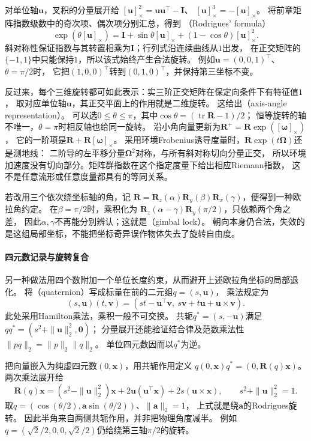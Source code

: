 对单位轴$\bm u$，叉积的分量展开给
$[\bm u]_\times^2=\bm u\bm u^\top-\bm I$、
$[\bm u]_\times^3=-[\bm u]_\times$。
将前章矩阵指数级数中的奇次项、偶次项分别汇总，得到
（Rodrigues' formula）
\begin{equation}
 \exp(\theta[\bm u]_\times)
 =\bm I+\sin\theta[\bm u]_\times+(1-\cos\theta)[\bm u]_\times^2.
 \label{eq:geometry-rodrigues}
\end{equation}
斜对称性保证指数与其转置相乘为$\bm I$；行列式沿连续曲线从$1$出发，
在正交矩阵的$\{-1,1\}$中只能保持$1$，所以该式始终产生合法旋转。
例如$\bm u=(0,0,1)^\top$、$\theta=\pi/2$时，
它把$(1,0,0)^\top$转到$(0,1,0)^\top$，并保持第三坐标不变。

反过来，每个三维旋转都可如此表示：实三阶正交矩阵在保定向条件下有特征值$1$，
取对应单位轴$\bm u$，其正交平面上的作用就是二维旋转。
这给出（axis-angle representation）。
可以选$0\leq\theta\leq\pi$，其中$\cos\theta=(\operatorname{tr}\bm R-1)/2$；
恒等旋转的轴不唯一，$\theta=\pi$时相反轴也给同一旋转。
沿小角向量更新为$\bm R^+=\bm R\exp([\bm\omega]_\times)$，
它的一阶项是$\bm R+\bm R[\bm\omega]_\times$。
采用环境Frobenius诱导度量时，$\bm R\exp(t\bm\Omega)$还是测地线：
二阶导的左平移分量$\bm\Omega^2$对称，与所有斜对称切向分量正交，
所以环境加速度没有切向部分。矩阵群指数在这个指定度量下给出相应Riemann指数，
这不是任意流形或任意度量都具有的等同关系。

若改用三个依次绕坐标轴的角，记
$\bm R=\bm R_z(\alpha)\bm R_y(\beta)\bm R_x(\gamma)$，便得到一种欧拉角约定。
在$\beta=\pi/2$时，乘积化为
$\bm R_z(\alpha-\gamma)\bm R_y(\pi/2)$，只依赖两个角之差，
因此$\alpha,\gamma$不再能分别辨认；这就是（gimbal lock）。
朝向本身仍合法，失效的是这组局部坐标，不能把坐标奇异误作物体失去了旋转自由度。

\paragraph{四元数记录与旋转复合}
另一种做法用四个数附加一个单位长度约束，从而避开上述欧拉角坐标的局部退化。
将（quaternion）写成标量在前的二元组$q=(s,\bm u)$，
乘法规定为
\[
 (s,\bm u)(t,\bm v)
 =(st-\bm u^\top\bm v,\ s\bm v+t\bm u+\bm u\times\bm v).
\]
此处采用Hamilton乘法，乘积一般不可交换。
共轭$q^*=(s,-\bm u)$满足$qq^*=(s^2+\|\bm u\|_2^2,\bm0)$；
分量展开还能验证结合律及范数乘法性$\|pq\|_2=\|p\|_2\|q\|_2$。
单位四元数因而以$q^*$为逆。

把向量嵌入为纯虚四元数$(0,\bm x)$，用共轭作用定义
$q(0,\bm x)q^*=(0,\bm R(q)\bm x)$。
两次乘法展开给
\begin{equation}
 \bm R(q)\bm x
 =(s^2-\|\bm u\|_2^2)\bm x
 +2\bm u(\bm u^\top\bm x)+2s(\bm u\times\bm x),
 \qquad s^2+\|\bm u\|_2^2=1.
 \label{eq:geometry-quaternion-action}
\end{equation}
取$q=(\cos(\theta/2),\bm a\sin(\theta/2))$、$\|\bm a\|_2=1$，
上式就是绕$\bm a$的Rodrigues旋转。
因此半角来自两侧共轭作用，并非把物理角度减半。
例如$q=(\sqrt2/2,0,0,\sqrt2/2)$仍给绕第三轴$\pi/2$的旋转。

